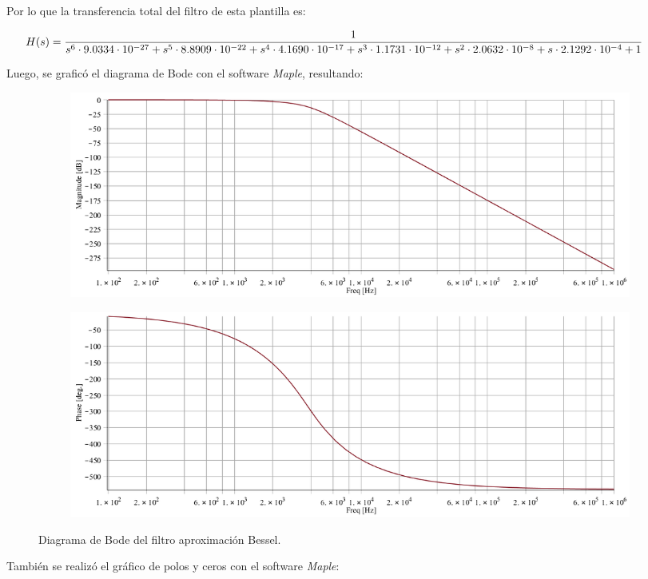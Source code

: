 Por lo que la transferencia total del filtro de esta plantilla es:

\begin{equation}
\hspace{-1cm}
H(s) = \frac{1}{s^6 \cdot 9.0334\cdot10^{-27}+s^5\cdot 8.8909\cdot10^{-22}+s^4\cdot 4.1690\cdot10^{-17}+s^3\cdot 1.1731\cdot10^{-12}+s^2\cdot 2.0632\cdot10^{-8}+s\cdot 2.1292\cdot10^{-4}+1}
\label{hsbesteo}
\end{equation}

Luego, se graficó el diagrama de Bode con el software \textit{Maple}, resultando:
\begin{figure}[H]
	\begin{subfigure}{\textwidth}
	\centering
	\includegraphics[width=\textwidth]{Imagenes-Ej1/bessel_hs.png}
	\end{subfigure}
	
	\begin{subfigure}{\textwidth}
	\centering
	\includegraphics[width=\textwidth]{Imagenes-Ej1/bessel_hspha.png}
	\end{subfigure}
	\label{fig:bodebes}
	\caption{Diagrama de Bode del filtro aproximación Bessel.}
\end{figure}
También se realizó el gráfico de polos y ceros con el software \textit{Maple}:

